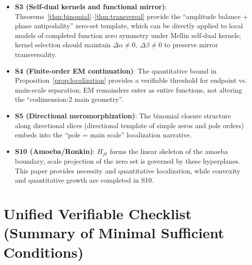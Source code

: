 \documentclass[11pt,a4paper]{article}
\theoremstyle{remark}
\begin{document}
\begin{itemize}
\item \textbf{S3 (Self-dual kernels and functional mirror)}: Theorems~\ref{thm:binomial}--\ref{thm:transversal} provide the ``amplitude balance + phase antipodality'' zero-set template, which can be directly applied to local models of completed function zero symmetry under Mellin self-dual kernels; kernel selection should maintain $\Delta\alpha\ne0,\ \Delta\beta\ne0$ to preserve mirror transversality.

\item \textbf{S4 (Finite-order EM continuation)}: The quantitative bound in Proposition~\ref{prop:localization} provides a verifiable threshold for endpoint vs. main-scale separation; EM remainders enter as entire functions, not altering the ``codimension-2 main geometry''.

\item \textbf{S5 (Directional meromorphization)}: The binomial closure structure along directional slices (directional template of simple zeros and pole orders) embeds into the ``pole = main scale'' localization narrative.

\item \textbf{S10 (Amoeba/Ronkin)}: $H_{jk}$ forms the linear skeleton of the amoeba boundary; scale projection of the zero set is governed by these hyperplanes. This paper provides necessity and quantitative localization, while convexity and quantitative growth are completed in S10.
\end{itemize}

\section{Unified Verifiable Checklist (Summary of Minimal Sufficient Conditions)}
\end{document}
